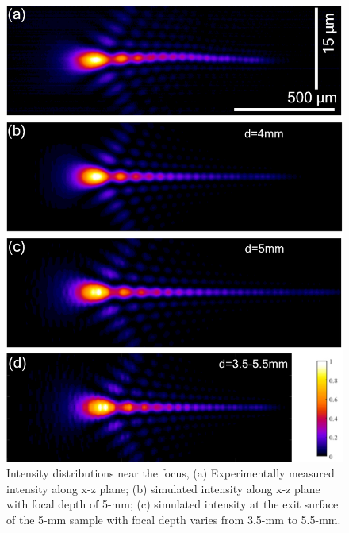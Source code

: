 \documentclass[9pt,twocolumn,twoside]{osajnl}
\begin{document}
\begin{figure}[t]
	\centering
	\includegraphics[width=\linewidth]{../AppOptics/figures/50xSi.pdf}
	\caption{Intensity distributions near the focus, (a) Experimentally measured intensity along x-z plane; (b) simulated intensity along x-z plane with focal depth of 5-mm; (c) simulated intensity at the exit surface of the 5-mm sample with focal depth varies from 3.5-mm to 5.5-mm.}\label{fig:5}
\end{figure}
\end{document}
